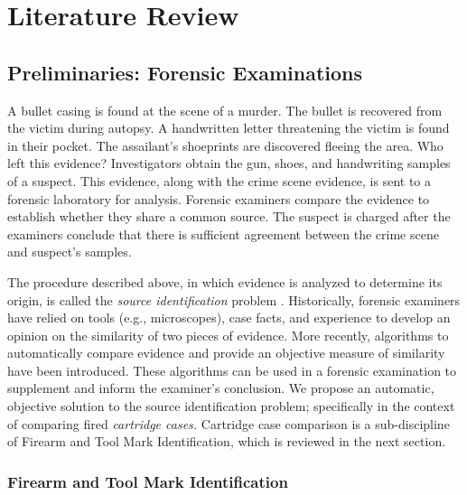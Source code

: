 \documentclass[11pt,]{isuthesis}
\begin{document}
\newpage
{}

\setlength\parindent{24pt}

\hypertarget{literature-review}{%
\chapter{Literature Review}\label{literature-review}}

\hypertarget{preliminaries-forensic-examinations}{%
\section{Preliminaries: Forensic Examinations}\label{preliminaries-forensic-examinations}}

A bullet casing is found at the scene of a murder.
The bullet is recovered from the victim during autopsy.
A handwritten letter threatening the victim is found in their pocket.
The assailant's shoeprints are discovered fleeing the area.
Who left this evidence?
Investigators obtain the gun, shoes, and handwriting samples of a suspect.
This evidence, along with the crime scene evidence, is sent to a forensic laboratory for analysis.
Forensic examiners compare the evidence to establish whether they share a common source.
The suspect is charged after the examiners conclude that there is sufficient agreement between the crime scene and suspect's samples.

The procedure described above, in which evidence is analyzed to determine its origin, is called the \emph{source identification} problem \citep{Ommen2018}.
Historically, forensic examiners have relied on tools (e.g., microscopes), case facts, and experience to develop an opinion on the similarity of two pieces of evidence.
More recently, algorithms to automatically compare evidence and provide an objective measure of similarity have been introduced.
These algorithms can be used in a forensic examination to supplement and inform the examiner's conclusion.
We propose an automatic, objective solution to the source identification problem; specifically in the context of comparing fired \emph{cartridge cases.}
Cartridge case comparison is a sub-discipline of Firearm and Tool Mark Identification, which is reviewed in the next section.

\hypertarget{firearm-and-tool-mark-identification}{%
\subsection{Firearm and Tool Mark Identification}\label{firearm-and-tool-mark-identification}}
\end{document}
